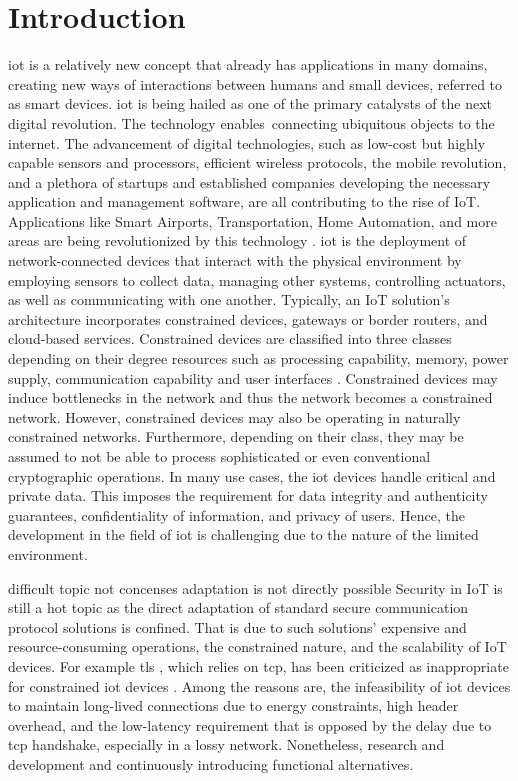 \chapter{Introduction}
\label{ch:introduction}

\gls{iot} is a relatively new concept that already has applications in many domains, creating new ways of interactions between humans and small devices, referred to as smart devices. \gls{iot} is being hailed as one of the primary catalysts of the next digital revolution. The technology enables connecting ubiquitous objects to the internet. The advancement of digital technologies, such as low-cost but highly capable sensors and processors, efficient wireless protocols, the mobile revolution, and a plethora of startups and established companies developing the necessary application and management software, are all contributing to the rise of IoT.
Applications like Smart Airports, Transportation, Home Automation, and more areas are being revolutionized by this technology \cite{marksteiner2017overview}.
\gls{iot} is the deployment of network-connected devices that interact with the physical environment by employing sensors to collect data, managing other systems, controlling actuators, as well as communicating with one another. Typically, an IoT solution's architecture incorporates constrained devices, gateways or border routers, and cloud-based services. Constrained devices are classified into three classes depending on their degree resources such as processing capability, memory, power supply, communication capability and user interfaces \cite{rfc7228}. Constrained devices may induce bottlenecks in the network and thus the network becomes a constrained network. However, constrained devices may also be operating in naturally constrained networks. Furthermore, depending on their class, they may be assumed to not be able to process sophisticated or even conventional cryptographic operations. In many use cases, the \gls{iot} devices handle critical and private data. This imposes the requirement for data integrity and authenticity guarantees, confidentiality of information, and privacy of users. Hence, the development in the field of \gls{iot} is challenging due to the nature of the limited environment.
\par
difficult topic not concenses adaptation is not directly possible
Security in IoT is still a hot topic as the direct adaptation of standard secure communication protocol solutions is confined. That is due to such solutions' expensive and resource-consuming operations, the constrained nature, and the scalability of IoT devices. For example \gls{tls} \cite{rfc5246}, which relies on \gls{tcp}, has been criticized as inappropriate for constrained \gls{iot} devices \cite{shang2016challenges}. Among the reasons are, the infeasibility of \gls{iot} devices to maintain long-lived connections due to energy constraints, high header overhead, and the low-latency requirement that is opposed by the delay due to \gls{tcp} handshake, especially in a lossy network. Nonetheless, research and development and continuously introducing functional alternatives. 
